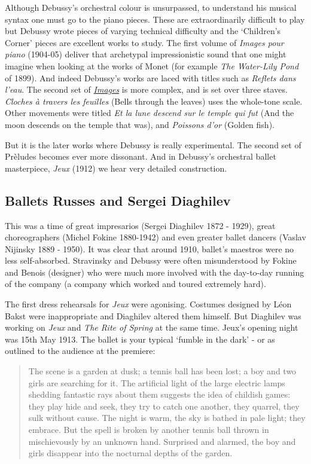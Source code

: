 Although Debussy's orchestral colour is unsurpassed, to understand his musical syntax one must go to the piano pieces. These are extraordinarily difficult to play but Debussy wrote pieces of varying technical difficulty and the `Children's Corner' pieces are excellent works to study. The first volume of \textit{Images pour piano} (1904-05) deliver that archetypal impressionistic sound that one might imagine when looking at the works of Monet (for example \textit{The Water-Lily Pond} of 1899). And indeed Debussy's works  are laced with titles such as \textit{Reflets dans l'eau}. The second set of \href{http://petrucci.mus.auth.gr/imglnks/usimg/4/4a/IMSLP254485-PMLP02391-Debussy__Claude-Images_2e_Serie_pour_Piano_seul_Durand_6994_scan.pdf}{\textit{Images}} is more complex, and is set over three staves. \textit{Cloches \`a travers les feuilles} (Bells through the leaves) uses the whole-tone scale. Other movements were titled \textit{Et la lune descend sur le temple qui fut} (And the moon descends on the temple that was), and \textit{Poissons d'or} (Golden fish). 

But it is the later works where Debussy is really experimental. The second set of Pr\`eludes becomes ever more dissonant. And in Debussy's orchestral ballet masterpiece, \textit{Jeux} (1912) we hear very detailed construction. 

\subsection{Ballets Russes and Sergei Diaghilev}
This was a time of great impresarios (Sergei Diaghilev 1872 - 1929), great choreographers (Michel Fokine 1880-1942) and even greater ballet dancers (Vaslav Nijinsky 1889 - 1950). It was clear that around 1910, ballet's maestros were no less self-absorbed. Stravinsky and Debussy were often misunderstood by Fokine and Benois (designer) who were much more involved with the day-to-day running of the company (a company which worked and toured extremely hard). 

The first dress rehearsals for \textit{Jeux} were agonising. Costumes designed by L\'eon Bakst were inappropriate and Diaghilev altered them himself. But Diaghilev was working on \textit{Jeux} and \textit{The Rite of Spring} at the same time. Jeux's opening night was 15th May 1913. The ballet is your typical `fumble in the dark' - or as outlined to the audience at the premiere:

\begin{quotation}
The scene is a garden at dusk; a tennis ball has been lost; a boy and two girls are searching for it. The artificial light of the large electric lamps shedding fantastic rays about them suggests the idea of childish games: they play hide and seek, they try to catch one another, they quarrel, they sulk without cause. The night is warm, the sky is bathed in pale light; they embrace. But the spell is broken by another tennis ball thrown in mischievously by an unknown hand. Surprised and alarmed, the boy and girls disappear into the nocturnal depths of the garden.
\end{quotation}

